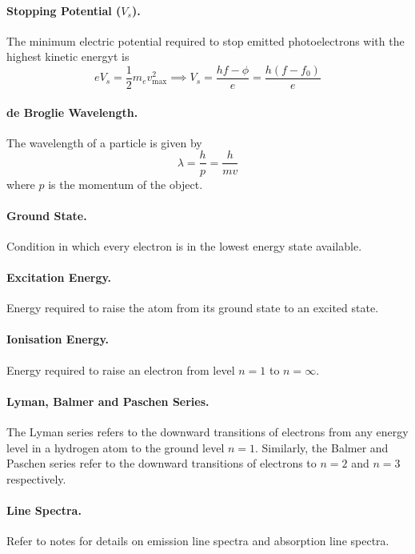\documentclass{article}
\begin{document}
\paragraph{Stopping Potential ($V_s$).} The minimum electric potential required
to stop emitted photoelectrons with the highest kinetic energyt is
\begin{equation} eV_s = \frac{1}{2}m_ev_{\text{max}}^2 \implies V_s = \frac{hf -
\phi}{e} = \frac{h(f - f_0)}{e} \end{equation}

\paragraph{de Broglie Wavelength.} The wavelength of a particle is given by
\begin{equation} \lambda = \frac{h}{p} = \frac{h}{mv} \end{equation} where $p$
  is the momentum of the object.

\paragraph{Ground State.} Condition in which every electron is in the lowest
energy state available.

\paragraph{Excitation Energy.} Energy required to raise the atom from its ground
state to an excited state.

\paragraph{Ionisation Energy.} Energy required to raise an electron from level
$n = 1$ to $n = \infty$.

\paragraph{Lyman, Balmer and Paschen Series.} The Lyman series refers to the
downward transitions of electrons from any energy level in a hydrogen atom to
the ground level $n = 1$. Similarly, the Balmer and Paschen series refer to the
downward transitions of electrons to $n = 2$ and $n = 3$ respectively.

\paragraph{Line Spectra.} Refer to notes for details on emission line spectra
and absorption line spectra.
\end{document}
